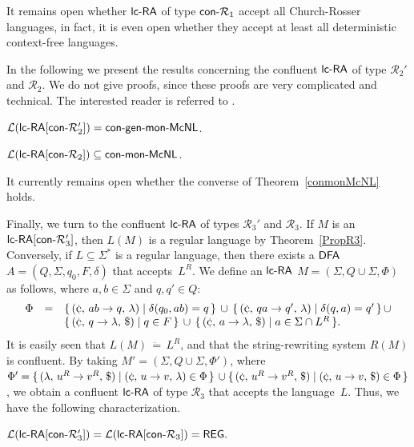 It remains open whether $\lcRA$ of type $\textup{\sf con-}\mathcal{R}_1$ accept all Church-Rosser languages, in fact, it is even open whether they accept at least all deterministic context-free languages.

In the following we present the results concerning the confluent $\lcRA$ of type $\mathcal{R}_2'$ and $\mathcal{R}_2$. We do not give proofs, since these proofs are very complicated and technical. The interested reader is referred to \cite{OCM13}.

\begin{theorem}\label{congenmonMcNL}
$\mathcal{L}(\textup{\sf lc-RA$[\textup{\sf con-}\mathcal{R}_2']$}) = \textup{\sf con-gen-mon-McNL}$.
\end{theorem}
%
\begin{theorem}\label{conmonMcNL}
$\mathcal{L}(\textup{\sf lc-RA$[\textup{\sf con-}\mathcal{R}_2]$}) \subseteq \textup{\sf con-mon-McNL}$.
\end{theorem}

It currently remains open whether the converse of Theorem~\ref{conmonMcNL} holds.

Finally, we turn to the confluent $\lcRA$ of types  $\mathcal{R}_3'$ and $\mathcal{R}_3$. If $M$ is an $\textup{\sf lc-RA$[\textup{\sf con-}\mathcal{R}_3']$}$, then $L(M)$ is a regular language by Theorem~\ref{PropR3}. Conversely, if $L\subseteq\Sigma^*$ is a regular language, then there exists a $\textup{\sf DFA}$ $A=(Q,\Sigma,q_0,F,\delta)$ that accepts~$L^R$. We define an $\lcRA$ $M=(\Sigma,Q\cup\Sigma,\Phi)$ as follows, where $a,b\in\Sigma$ and $q,q'\in Q$:
$$\begin{array}{ccl}
\Phi & = & \{\,\rarule{\cent}{ab}{q}{\lambda}  \mid  \delta(q_0,ab)=q\,\}
      \,  \cup \,  \{\,\rarule{\cent}{qa}{q'}{\lambda}  \mid  \delta(q,a)=q'\,\} \,\cup \\
     &   & \{\,\rarule{\cent}{q}{\lambda}{\$}  \mid  q\in F\,\}
      \, \cup  \, \{\,\rarule{\cent}{a}{\lambda}{\$}  \mid a\in \Sigma\cap L^R\,\}.
\end{array}$$
It is easily seen that $L(M)\,\dot{=}\,L^R$, and that the string-rewriting system $R(M)$ is confluent. By taking $M'=(\Sigma,Q\cup\Sigma,\Phi')$, where
$\Phi' = \{\,\rarule{\lambda}{u^R}{v^R}{\$} \mid \rarule{\cent}{u}{v}{\lambda}\in \Phi\,\} 
         \,\cup
         \{\,\rarule{\cent}{u^R}{v^R}{\$} \mid \rarule{\cent}{u}{v}{\$}\in \Phi\,\}$,
we obtain a confluent $\lcRA$ of type $\mathcal{R}_3$ that accepts the language~$L$. Thus, we have the following characterization.
%
\begin{theorem}\label{PropConR3}
${\mathcal L}(\textup{\sf lc-RA$[\textup{\sf con-}\mathcal{R}_3']$}) = {\mathcal L}(\textup{\sf lc-RA$[\textup{\sf con-}\mathcal{R}_3]$}) = \textup{\sf REG}.$
\end{theorem}

